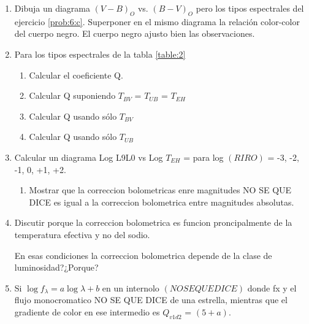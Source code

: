 \documentclass[12pt,spanish,a4paper]{practice}
\begin{document}
\begin{enumerate}[wide, labelwidth=!, labelindent=0pt, label=\textbf{\arabic*)}, ref=\arabic*]
        \item\label{prob:7} Dibuja un diagrama $\left(V-B\right)_O$ vs. $\left(B-V\right)_O$ pero los tipos espectrales del ejercicio \ref{prob:6:c}. Superponer en el mismo diagrama la relación color-color del cuerpo negro. El cuerpo negro ajusto bien las observaciones.

        \item\label{prob:8}Para los tipos espectrales de la tabla \ref{table:2}
            \begin{enumerate}[label=\alph*., ref=\theenumi\alph*]
                \item \label{prob:8:a}  Calcular el coeficiente Q.

                \item \label{prob:8:b} Calcular Q suponiendo $T_{BV}$ = $T_{UB}$ = $T_{EH}$

                \item \label{prob:8:c} Calcular Q usando sólo $T_{BV}$

                \item \label{prob:8:d} Calcular Q usando sólo $T_{UB}$
            \end{enumerate}

        \item\label{prob:9}Calcular un diagrama Log L9L0 vs Log $T_{EH}$ = para log $\left(RIRO\right)$ = -3, -2, -1, 0, +1, +2.

            \begin{enumerate}[label=\alph*., ref=\theenumi\alph*]
                \item\label{prob:9:a} Mostrar que la correccion bolometricas enre magnitudes NO SE QUE DICE  es igual a la correccion bolometrica entre magnitudes absolutas.
            \end{enumerate}

        \item\label{prob:10} Discutir porque la correccion bolometrica es funcion proncipalmente de la temperatura efectiva y no del sodio.

        En esas condiciones la correccion bolometrica depende de la clase de luminosidad?¿Porque?

        \item\label{prob:11} Si $\log f_{\lambda} = a\log\lambda + b$ en un internolo $\left(NO SE QUE DICE\right)$ donde fx y el flujo monocromatico NO SE QUE DICE de una estrella, mientras que el gradiente de color en ese intermedio es $Q_{v1d2}$ = $\left(5+a\right)$.


\end{enumerate}
\end{document}
